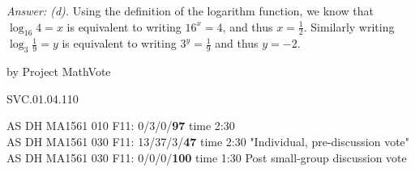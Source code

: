 {\it Answer: (d).} Using the definition of the logarithm function, we know that $\log _{16} 4 = x$ is equivalent to writing $16^x = 4$, and thus $x = \frac{1}{2}$.  Similarly writing $\log_3 \frac{1}{9} = y$ is equivalent to writing $3^y = \frac{1}{9}$ and thus $y = -2$.

\medskip

by Project MathVote

SVC.01.04.110

AS DH MA1561 010 F11: 0/3/0/{\bf97} time 2:30  \\
AS DH MA1561 030 F11: 13/37/3/{\bf47} time 2:30 "Individual, pre-discussion vote" \\
AS DH MA1561 030 F11: 0/0/0/{\bf100} time 1:30 Post small-group discussion vote \\
